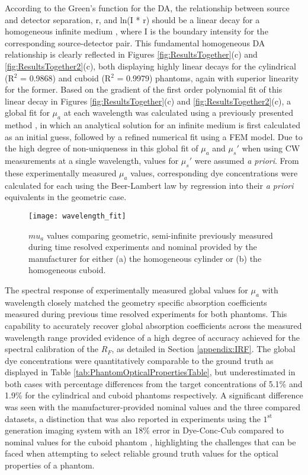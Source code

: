 \documentclass[twoside]{bhamthesis}
\theoremstyle{definition}
\begin{document}
According to the Green's function for the DA, the relationship between source and detector separation, r, and ln(I * r) should be a linear decay for a homogeneous infinite medium \cite{patterson1989quantitative}, where I is the boundary intensity for the corresponding source-detector pair. This fundamental homogeneous DA relationship is clearly reflected in Figures \ref{fig:ResultsTogether}(c) and \ref{fig:ResultsTogether2}(c), both displaying highly linear decays for the cylindrical (R$^2$  = 0.9868) and cuboid (R$^2$ = 0.9979) phantoms, again with superior linearity for the former. Based on the gradient of the first order polynomial fit of this linear decay in Figures \ref{fig:ResultsTogether}(c) and \ref{fig:ResultsTogether2}(c), a global fit for $\mu_a$ at each wavelength was calculated using a previously presented method \cite{mcbride2003strategies}, in which an analytical solution for an infinite medium is first calculated as an initial guess, followed by a refined numerical fit using a FEM model. Due to the high degree of non-uniqueness in this global fit of $\mu_a$ and $\mu_s'$ when using CW measurements at a single wavelength, values for $\mu_s'$ were assumed \textit{a priori}. From these experimentally measured $\mu_a$ values, corresponding dye concentrations were calculated for each using the Beer-Lambert law by regression into their \textit{a priori} equivalents in the geometric case.

\begin{figure}[!ht]
\centering
  \texttt{[image: wavelength\_fit]}
  \caption{$mu_a$ values comparing geometric, semi-infinite previously measured during time resolved experiments \cite{guggenheim2016time} and nominal provided by the manufacturer for either (a) the homogeneous cylinder or (b) the homogeneous cuboid.}
    \label{fig:wavelength_fit}
\end{figure}

The spectral response of experimentally measured global values for $\mu_a$ with wavelength closely matched the geometry specific absorption coefficients measured during previous time resolved experiments \cite{guggenheim2016time} for both phantoms. This capability to accurately recover global absorption coefficients across the measured wavelength range provided evidence of a high degree of accuracy achieved for the spectral calibration of the $R_F$, as detailed in Section \ref{appendix:IRF}. The global dye concentrations were quantitatively comparable to the ground truth as displayed in Table \ref{tab:PhantomOpticalPropertiesTable}, but underestimated in both cases with percentage differences from the target concentrations of 5.1\% and 1.9\% for the cylindrical and cuboid phantoms respectively. A significant difference was seen with the manufacturer-provided nominal values and the three compared datasets, a distinction that was also reported in experiments using the $\mathrm{1^{st}}$ generation imaging system with an 18\% error in Dye-Conc-Cub compared to nominal values for the cuboid phantom \cite{wu2016development}, highlighting the challenges that can be faced when attempting to select reliable ground truth values for the optical properties of a phantom.
\end{document}
